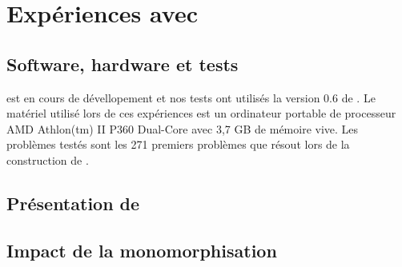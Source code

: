 \section{Expériences avec \beagle}
\subsection{Software, hardware et tests}
\beagle est en cours de dévellopement et nos tests ont utilisés la version 0.6 de \beagle. Le matériel utilisé lors de ces expériences est un ordinateur portable de processeur AMD Athlon(tm) II P360 Dual-Core avec 3,7 GB de mémoire vive. Les problèmes testés sont les 271 premiers problèmes que \metis résout lors de la construction de \holfour.

\subsection{Présentation de \beagle}


\subsection{Impact de la monomorphisation}




